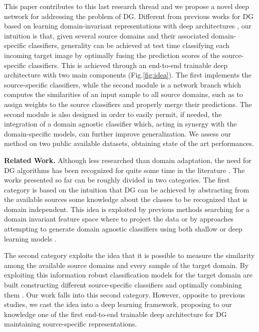 \documentclass{article}
\newcommand{\myparagraph}[1]{\vspace{5pt}\noindent\textbf{#1}}
\begin{document}
This paper contributes to this last research thread and we propose a novel deep network for addressing the problem of DG. Different from previous works for DG based on learning domain-invariant representations with deep architectures \cite{li2017deeper,ghifary2015domain}, our intuition is that, given several source domains and their associated domain-specific classifiers, generality can be achieved at test time classifying each incoming target image by optimally fusing the prediction scores of the source-specific classifiers. This is achieved through an end-to-end trainable deep architecture with two main components (Fig.\ref{fig:idea}). The first implements the source-specific classifiers, while the second module is a network branch which computes the similarities of an input sample to all source domains, such as to assign weights to the source classifiers and properly merge their predictions. The second module is also designed in order to easily permit, if needed, the integration of a domain agnostic classifier which, acting in synergy with the domain-specific models, can further improve generalization. We assess our method on two public available datasets, obtaining state of the art performances. 



  







\myparagraph{Related Work.} 
Although less researched than domain adaptation, the need for DG algorithms has been recognized for quite some time in the literature \cite{muandet2013domain}. The works presented so far can be roughly divided in two categories. The first category is based on the intuition that DG can be achieved by abstracting from the available sources some knowledge about the classes to be recognized that is domain independent. This idea is exploited by previous
methods searching for a domain invariant feature space where to project the data \cite{ghifary2015domain,muandet2013domain} or by approaches attempting to generate domain agnostic classifiers using both shallow \cite{tommasi2012accv,grubinger2017multi} or deep learning models \cite{li2017deeper,motiian2017unified,li2017domain}.

The second category exploits the idea that it is possible to measure the similarity among the available source domains and every sample of the target domain. By exploiting this information robust classification models for the target domain are built constructing different source-specific classifiers and optimally combining them \cite{xu2014exploiting,mancini2018robust}.
Our work falls into this second category. However, opposite to previous studies, we cast the idea into a deep learning framework, proposing to our knowledge one of the first end-to-end trainable deep architecture for DG maintaining source-specific representations. \vspace{-0.4cm} 
\end{document}

